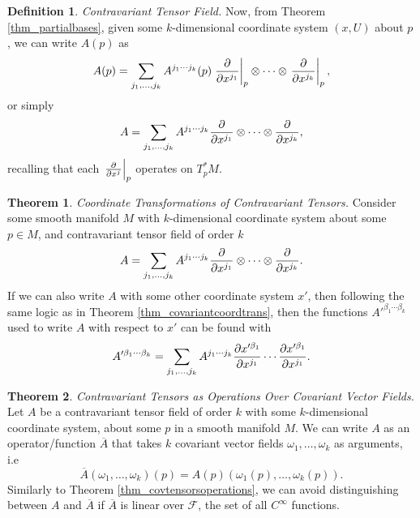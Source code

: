 \documentclass[10pt,landscape]{article}
\theoremstyle{definition}
\newtheorem{definition}{Definition}[section]
\theoremstyle{theorem}
\newtheorem{theorem}{Theorem}[section]
\theoremstyle{summary}
\theoremstyle{remark}
\newcommand{\Ci}{C^\infty}
\begin{document}
\begin{multicols*}{3}
\begin{definition}{\textit{Contravariant Tensor Field.}}
    Now, from Theorem \ref{thm_partialbases}, given some $k$-dimensional coordinate system $(x, U)$ about $p$, we can write $A(p)$ as
    \begin{equation}
        A(p) = \sum\limits_{j_1,\ldots,j_k}A^{j_1\cdots j_k}(p)\left.\pdv{}{x^{j_1}}\right|_p\otimes\cdots\otimes\left.\pdv{}{x^{j_k}}\right|_p,
    \end{equation}
    or simply
    \begin{equation}
        A = \sum\limits_{j_1,\ldots,j_k}A^{j_1\cdots j_k}\pdv{}{x^{j_1}}\otimes\cdots\otimes\pdv{}{x^{j_k}},
    \end{equation}
    recalling that each $\left.\pdv{}{x^{j}}\right|_p$ operates on $T_p^*M$.
\end{definition}

\theoremstyle{theorem}
\begin{theorem}{\textit{Coordinate Transformations of Contravariant Tensors.}}
    Consider some smooth manifold $M$ with $k$-dimensional coordinate system about some $p\in M$, and contravariant tensor field of order $k$
    \begin{equation}
        A = \sum\limits_{j_1,\ldots,j_k}A^{j_1\cdots j_k}\pdv{}{x^{j_1}}\otimes\cdots\otimes\pdv{}{x^{j_k}}.
    \end{equation}
    If we can also write $A$ with some other coordinate system $x'$, then following the same logic as in Theorem \ref{thm_covariantcoordtrans}, then the functions $A'^{\beta_1\cdots\beta_k}$ used to write $A$ with respect to $x'$ can be found with
    \begin{equation}
        A'^{\beta_1\cdots\beta_k} = \sum\limits_{j_1,\ldots,j_k}A^{j_1\cdots j_k}\pdv{x'^{\beta_1}}{x^{j_1}}\cdots\pdv{x'^{\beta_1}}{x^{j_1}}.
    \end{equation}

\end{theorem}

\theoremstyle{theorem}
\begin{theorem}{\textit{Contravariant Tensors as Operations Over Covariant Vector Fields.}}
    Let $A$ be a contravariant tensor field of order $k$ with some $k$-dimensional coordinate system, about some $p$ in a smooth manifold $M$. We can write $A$ as an operator/function $\overline{A}$ that takes $k$ covariant vector fields $\omega_1,\ldots,\omega_k$ as arguments, i.e
    \begin{equation}
        \overline{A}(\omega_1,\ldots,\omega_k)(p) = A(p)(\omega_1(p),\ldots,\omega_k(p)).
    \end{equation}
    Similarly to Theorem \ref{thm_covtensorsoperations}, we can avoid distinguishing between $A$ and $\overline{A}$ if $\overline{A}$ is linear over $\mathcal{F}$, the set of all $\Ci$ functions.
\end{theorem}
 
\end{multicols*}
\end{document}
